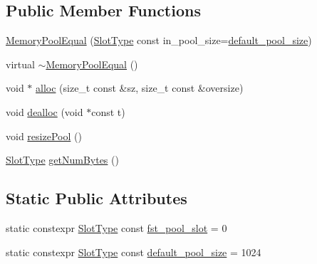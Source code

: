 \subsection*{Public Member Functions}
\begin{DoxyCompactItemize}
\item 
\hyperlink{structvt_1_1pool_1_1_memory_pool_equal_a588ccd66ce55b16d85ee47a739ec7cdd}{Memory\+Pool\+Equal} (\hyperlink{structvt_1_1pool_1_1_memory_pool_equal_a101fdcb943d0cb0863cf17655e0b4e1c}{Slot\+Type} const in\+\_\+pool\+\_\+size=\hyperlink{structvt_1_1pool_1_1_memory_pool_equal_a67dae02a7795b182a7302b9eb34924e7}{default\+\_\+pool\+\_\+size})
\item 
virtual \hyperlink{structvt_1_1pool_1_1_memory_pool_equal_a3639b62858bef876bf6f8a51cfdb7212}{$\sim$\+Memory\+Pool\+Equal} ()
\item 
void $\ast$ \hyperlink{structvt_1_1pool_1_1_memory_pool_equal_a070cb7e7f56cde226fe95a71832d7deb}{alloc} (size\+\_\+t const \&sz, size\+\_\+t const \&oversize)
\item 
void \hyperlink{structvt_1_1pool_1_1_memory_pool_equal_af02c22884cf082406c7f5dd00d9b77c8}{dealloc} (void $\ast$const t)
\item 
void \hyperlink{structvt_1_1pool_1_1_memory_pool_equal_acb03d02014eaebd24522525b059d4fb4}{resize\+Pool} ()
\item 
\hyperlink{structvt_1_1pool_1_1_memory_pool_equal_a101fdcb943d0cb0863cf17655e0b4e1c}{Slot\+Type} \hyperlink{structvt_1_1pool_1_1_memory_pool_equal_a5a760235c3429f60ba394d166ee0e26b}{get\+Num\+Bytes} ()
\end{DoxyCompactItemize}
\subsection*{Static Public Attributes}
\begin{DoxyCompactItemize}
\item 
static constexpr \hyperlink{structvt_1_1pool_1_1_memory_pool_equal_a101fdcb943d0cb0863cf17655e0b4e1c}{Slot\+Type} const \hyperlink{structvt_1_1pool_1_1_memory_pool_equal_ae0435baf515fefccc015b600357bc6bb}{fst\+\_\+pool\+\_\+slot} = 0
\item 
static constexpr \hyperlink{structvt_1_1pool_1_1_memory_pool_equal_a101fdcb943d0cb0863cf17655e0b4e1c}{Slot\+Type} const \hyperlink{structvt_1_1pool_1_1_memory_pool_equal_a67dae02a7795b182a7302b9eb34924e7}{default\+\_\+pool\+\_\+size} = 1024
\end{DoxyCompactItemize}


